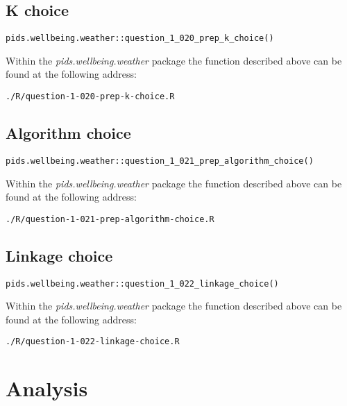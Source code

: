 \documentclass[12pt, oneside, openany]{book}
\begin{document}
\subsection*{ K choice}

\begin{verbatim}
pids.wellbeing.weather::question_1_020_prep_k_choice()
\end{verbatim}

Within the \emph{pids.wellbeing.weather} package the function described above can be found at the following address:

\begin{verbatim}
./R/question-1-020-prep-k-choice.R
\end{verbatim}

\subsection*{Algorithm choice}

\begin{verbatim}
pids.wellbeing.weather::question_1_021_prep_algorithm_choice()
\end{verbatim}

Within the \emph{pids.wellbeing.weather} package the function described above can be found at the following address:

\begin{verbatim}
./R/question-1-021-prep-algorithm-choice.R
\end{verbatim}

\subsection*{Linkage choice}

\begin{verbatim}
pids.wellbeing.weather::question_1_022_linkage_choice()
\end{verbatim}

Within the \emph{pids.wellbeing.weather} package the function described above can be found at the following address:

\begin{verbatim}
./R/question-1-022-linkage-choice.R
\end{verbatim}

\section*{Analysis}
\end{document}
